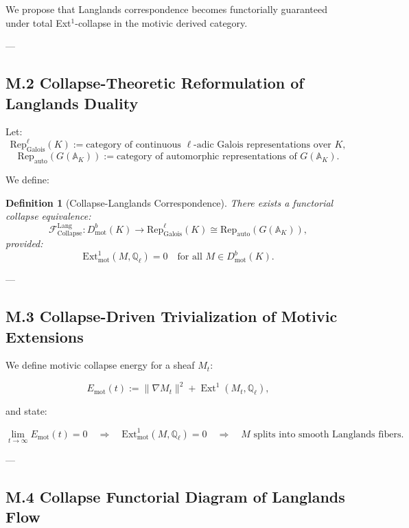 \documentclass[11pt]{article}
\newtheorem{definition}[theorem]{Definition}
\begin{document}
We propose that Langlands correspondence becomes functorially guaranteed under total Ext$^1$-collapse in the motivic derived category.

---

\subsection*{M.2 Collapse-Theoretic Reformulation of Langlands Duality}

Let:
\[
\mathrm{Rep}_\mathrm{Galois}^\ell(K) := \text{category of continuous } \ell\text{-adic Galois representations over } K,
\]
\[
\mathrm{Rep}_\mathrm{auto}(G(\mathbb{A}_K)) := \text{category of automorphic representations of } G(\mathbb{A}_K).
\]

We define:

\begin{definition}[Collapse-Langlands Correspondence]
There exists a functorial collapse equivalence:
\[
\mathcal{F}_{\mathrm{Collapse}}^{\mathrm{Lang}} :
D^b_{\mathrm{mot}}(K) \to \mathrm{Rep}_\mathrm{Galois}^\ell(K) \cong \mathrm{Rep}_\mathrm{auto}(G(\mathbb{A}_K)),
\]
provided:
\[
\mathrm{Ext}^1_{\mathrm{mot}}(M, \mathbb{Q}_\ell) = 0
\quad \text{for all } M \in D^b_{\mathrm{mot}}(K).
\]
\end{definition}

---

\subsection*{M.3 Collapse-Driven Trivialization of Motivic Extensions}

We define motivic collapse energy for a sheaf $M_t$:

\[
E_{\mathrm{mot}}(t) := \|\nabla M_t\|^2 + \operatorname{Ext}^1(M_t, \mathbb{Q}_\ell),
\]

and state:

\begin{proposition}
\[
\lim_{t \to \infty} E_{\mathrm{mot}}(t) = 0
\quad \Rightarrow \quad
\mathrm{Ext}^1_{\mathrm{mot}}(M, \mathbb{Q}_\ell) = 0
\quad \Rightarrow \quad
M \text{ splits into smooth Langlands fibers}.
\]
\end{proposition}

---

\subsection*{M.4 Collapse Functorial Diagram of Langlands Flow}
\end{document}
